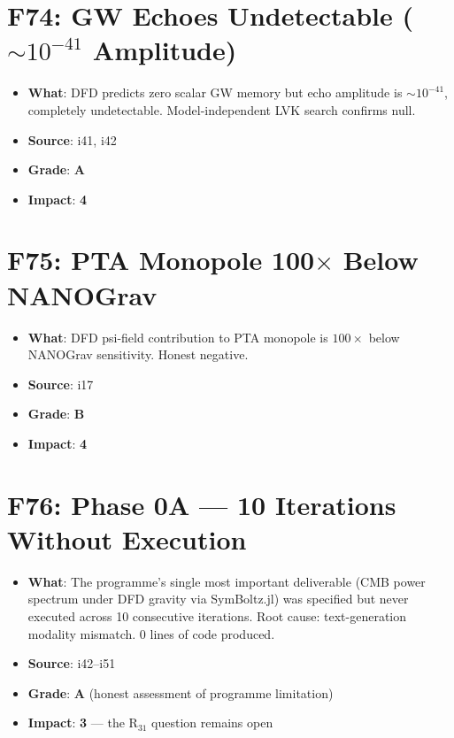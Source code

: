 \documentclass[11pt,a4paper]{article}
\newcommand{\grade}[1]{\textbf{#1}}
\newcommand{\impact}[1]{\textbf{#1}}
\begin{document}
\section{F74: GW Echoes Undetectable ($\sim 10^{-41}$ Amplitude)}
\begin{itemize}[nosep]
\item \textbf{What}: DFD predicts zero scalar GW memory but echo amplitude is $\sim 10^{-41}$, completely undetectable. Model-independent LVK search confirms null.
\item \textbf{Source}: i41, i42
\item \textbf{Grade}: \grade{A}
\item \textbf{Impact}: \impact{4}
\end{itemize}

\section{F75: PTA Monopole 100$\times$ Below NANOGrav}
\begin{itemize}[nosep]
\item \textbf{What}: DFD psi-field contribution to PTA monopole is $100\times$ below NANOGrav sensitivity. Honest negative.
\item \textbf{Source}: i17
\item \textbf{Grade}: \grade{B}
\item \textbf{Impact}: \impact{4}
\end{itemize}

\section{F76: Phase 0A --- 10 Iterations Without Execution}
\begin{itemize}[nosep]
\item \textbf{What}: The programme's single most important deliverable (CMB power spectrum under DFD gravity via SymBoltz.jl) was specified but never executed across 10 consecutive iterations. Root cause: text-generation modality mismatch. 0 lines of code produced.
\item \textbf{Source}: i42--i51
\item \textbf{Grade}: \grade{A} (honest assessment of programme limitation)
\item \textbf{Impact}: \impact{3} --- the R$_{31}$ question remains open
\end{itemize}
\end{document}
